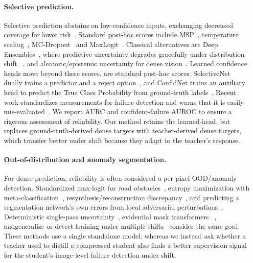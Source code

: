 \documentclass{article}
\begin{document}
\paragraph{Selective prediction.} Selective prediction abstains on low-confidence inputs, exchanging decreased coverage for lower risk~\cite{geifman2017selective}. Standard post-hoc scores include MSP~\cite{hendrycks2017baseline}, temperature scaling~\cite{guo2017calibration}, MC-Dropout~\cite{gal2016dropout} and MaxLogit~\cite{hendrycks2022scaling}. Classical alternatives are Deep Ensembles~\cite{lakshminarayanan2017deepensembles}, where predictive uncertainty degrades gracefully under distribution shift ~\cite{ovadia2019trust}, and aleatoric/epistemic uncertainty for dense vision~\cite{kendall2017uncertainties}. Learned confidence heads move beyond these scores. are standard post-hoc scores. SelectiveNet dually trains a predictor and a reject option~\cite{geifman2019selectivenet}, and ConfidNet trains an auxiliary head to predict the True Class Probability from ground-truth labels~\cite{corbiere2019confidnet}. Recent work standardizes measurements for failure detection and warns that it is easily mis-evaluated~\cite{jaeger2023call, traub2024overcoming}. We report AURC and confident-failure AUROC to ensure a rigerous assessment of reliability. Our method retains the learned-head, but replaces ground-truth-derived dense targets with teacher-derived dense targets, which transfer better under shift because they adapt to the teacher's response.

\paragraph{Out-of-distribution and anomaly segmentation.} For dense prediction, reliability is often considered a per-pixel OOD/anomaly detection. Standardized max-logit for road obstacles~\cite{jung2021standardized}, entropy maximization with meta-classification~\cite{chan2021entropy}, resynthesis/reconstruction discrepancy~\cite{dibiase2021pixel}, and predicting a segmentation network's own errors from local adversarial perturbations~\cite{besnier2021triggering}. Deterministic single-pass uncertainty~\cite{mukhoti2023deep}, evidential mask transformers ~\cite{schmidt2025prior2former}, andgeneralize-or-detect training under multiple shifts~\cite{gao2024generalize} consider the same goal. These methods use a single standalone model; whereas we instead ask whether a teacher used to distill a compressed student also finds a better supervision signal for the student's image-level failure detection under shift.
\end{document}
